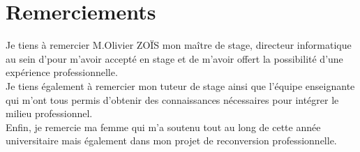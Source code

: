 \section*{Remerciements}
\noindent
{}
{}


Je tiens à remercier M.Olivier ZOÏS mon maître de stage, directeur informatique 
au sein d'\interlog  pour m’avoir accepté en stage et de m’avoir
offert la possibilité d’une expérience professionnelle.\\


Je tiens également à remercier mon tuteur de stage ainsi que l’équipe enseignante qui
m’ont tous permis d’obtenir des connaissances nécessaires pour intégrer le milieu
professionnel.\\


Enfin, je remercie ma femme qui m’a soutenu tout au long de cette année universitaire
mais également dans mon projet de reconversion professionnelle.

\newpage



